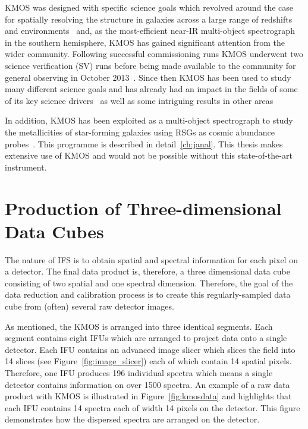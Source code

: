 KMOS was designed with specific science goals which revolved around the case for spatially resolving the structure in galaxies across a large range of redshifts and environments~\citep{2006NewAR..50..370S} and,
as the most-efficient near-IR multi-object spectrograph in the southern hemisphere,
KMOS has gained significant attention from the wider community.
Following successful commissioning runs KMOS underwent two science verification (SV) runs before being made available to the community for general observing in October 2013~\citep{2015IAUS..309...11S}.
Since then KMOS has been used to study many different science goals and has already had an impact in the fields of some of its key science drivers~\citep{2016MNRAS.456.1195H,2016MNRAS.456.4533M} as well as some intriguing results in other areas~\citep{2015A&A...584A...2F,2015MNRAS.453.3875P}

In addition, KMOS has been exploited as a multi-object spectrograph to study the metallicities of star-forming galaxies using RSGs as cosmic abundance probes~\citep{2015ApJ...805..182G,2015ApJ...812..160L,2015ApJ...803...14P}.
This programme is described in detail~\ref{ch:janal}.
This thesis makes extensive use of KMOS and would not be possible without this state-of-the-art instrument.



\section{Production of Three-dimensional Data Cubes} %
\label{sec:3Ddata}

The nature of IFS is to obtain spatial and spectral information for each pixel on a detector.
The final data product is, therefore, a three dimensional data cube consisting of two spatial and one spectral dimension.
Therefore, the goal of the data reduction and calibration process is to create this regularly-sampled data cube from (often) several raw detector images.

As mentioned, the KMOS is arranged into three identical segments.
Each segment contains eight IFUs which are arranged to project data onto a single detector.
Each IFU contains an advanced image slicer which slices the field into 14 slices (see Figure~\ref{fig:image_slicer}) each of which contain 14 spatial pixels.
Therefore, one IFU produces 196 individual spectra which means a single detector contains information on over 1500 spectra.
An example of a raw data product with KMOS is illustrated in Figure~\ref{fig:kmosdata} and highlights that each IFU contains 14 spectra each of width 14 pixels on the detector.
This figure demonstrates how the dispersed spectra are arranged on the detector.

